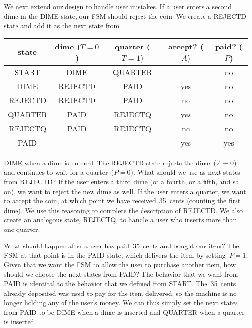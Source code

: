 \begin{minipage}{1.60in}
We next extend our design to handle user mistakes.  If a user enters
a second dime in the DIME state, our FSM should reject the coin.  We
create a REJECTD state and add it as the next state from\linebreak
\end{minipage}\hspace{0.25in}%
\begin{minipage}{4.65in}
\begin{tabular}{c|cc|cc}
state& dime ($T=0$)& quarter ($T=1$)& accept? ($A$)& paid? ($P$)\\ \hline
START& DIME& QUARTER& & no\\
DIME& REJECTD& PAID& yes& no\\
REJECTD& REJECTD& PAID& no& no\\
QUARTER& PAID& REJECTQ& yes& no\\
REJECTQ& PAID& REJECTQ& no& no\\
PAID& & & yes& yes
\end{tabular}\vspace{12pt}
\end{minipage}\mpdone

DIME when a dime is entered.
The REJECTD state rejects the dime~($A=0$) and
continues to wait for a quarter~($P=0$).  What should we use as next 
states from REJECTD?  If the user enters a third dime (or a fourth, 
or a fifth, and so on), we want to reject the new dime as well.  
If the user enters a quarter, we want to accept the coin, at which point
we have received~35~cents (counting the first dime).  We use
this reasoning to complete the description of REJECTD.  We also create
an analogous state, REJECTQ, to handle a user who inserts more than
one quarter.

What should happen after a user has paid~35~cents and bought 
one item?  The FSM at that point is in the PAID state, which delivers
the item by setting~$P=1$.
%
Given that we want the FSM to allow the user to purchase another item, 
how should we choose the next states from PAID?
%
The behavior that we want from PAID is identical to the behavior that
we defined from START.  The~35~cents already 
deposited was used to pay for the item delivered, so the machine is
no longer holding any of the user's money.
%
We can thus simply set the next states from PAID to be DIME when a 
dime is inserted and QUARTER when a quarter is inserted.

\pagebreak

